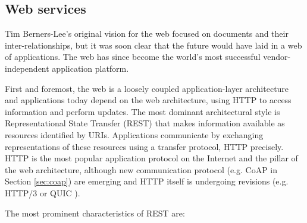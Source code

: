 \documentclass{ieeeaccess}
\begin{document}
\subsection{Web services}

Tim Berners-Lee's original vision for the web focused on documents and their inter-relationships, but it was soon clear that the future would have laid in a web of applications. The web has since become the world's most successful vendor-independent application platform.

First and foremost, the web is a loosely coupled application-layer architecture and applications today depend on the web architecture, using HTTP to access information and perform updates. The most dominant architectural style is Representational State Transfer (REST) \cite{rest} that makes information available as resources identified by URIs. Applications communicate by exchanging representations of these resources using a transfer protocol, HTTP precisely. HTTP is the most popular application protocol on the Internet and the pillar of the web architecture, although new communication protocol (e.g. CoAP in Section \ref{sec:coap}) are emerging and HTTP itself is undergoing revisions (e.g. HTTP/3 or QUIC \cite{quic}).

The most prominent characteristics of REST are:
\end{document}
